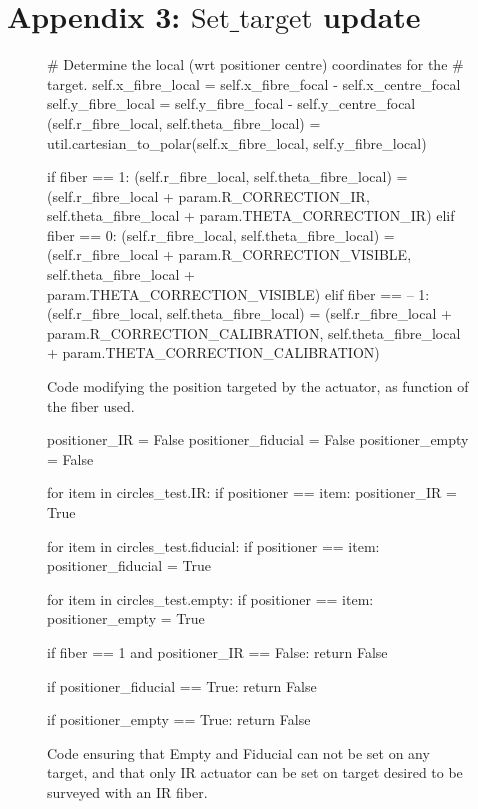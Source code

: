 \section{Appendix 3: $\textrm{Set_target}$ update}

\begin{figure}[h]
\begin{center}
	\scriptsize{
	\begin{python}
# Determine the local (wrt positioner centre) coordinates for the
# target.
self.x_fibre_local = self.x_fibre_focal - self.x_centre_focal
self.y_fibre_local = self.y_fibre_focal - self.y_centre_focal
(self.r_fibre_local, self.theta_fibre_local) = util.cartesian_to_polar(self.x_fibre_local, self.y_fibre_local)

if fiber == 1:
	(self.r_fibre_local, self.theta_fibre_local) = (self.r_fibre_local + param.R_CORRECTION_IR, self.theta_fibre_local + param.THETA_CORRECTION_IR)
elif fiber == 0:
	(self.r_fibre_local, self.theta_fibre_local) = (self.r_fibre_local + param.R_CORRECTION_VISIBLE, self.theta_fibre_local + param.THETA_CORRECTION_VISIBLE)
elif fiber == -- 1:
	(self.r_fibre_local, self.theta_fibre_local) = (self.r_fibre_local + param.R_CORRECTION_CALIBRATION, self.theta_fibre_local + param.THETA_CORRECTION_CALIBRATION)
	\end{python}
	}
	\caption{Code modifying the position targeted by the actuator, as function of the fiber used.}
	\label{fig:appendix:set_target:position}
\end{center}
\end{figure}

\begin{figure}[h]
\begin{center}
	\scriptsize{
	\begin{python}
positioner_IR = False
positioner_fiducial = False
positioner_empty = False

for item in circles_test.IR:
	if positioner == item:
		positioner_IR = True

for item in circles_test.fiducial:
	if positioner == item:
		positioner_fiducial = True

for item in circles_test.empty:
	if positioner == item:
		positioner_empty = True

if fiber == 1 and positioner_IR == False:
	return False

if positioner_fiducial == True:
	return False

if positioner_empty == True:
	return False
	\end{python}
	}
	\caption{Code ensuring that Empty and Fiducial can not be set on any target, and that only IR actuator can be set on target desired to be surveyed with an IR fiber.}
	\label{fig:appendix:set_target:attribution}
\end{center}
\end{figure}